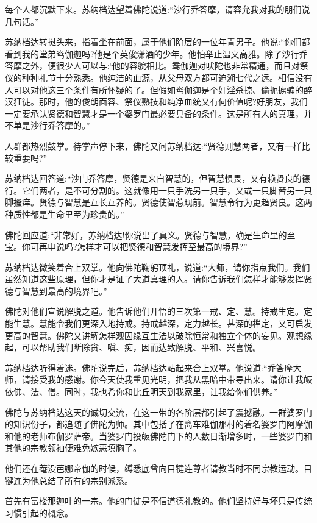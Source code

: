 \documentclass[12pt,twoside,openany]{book}
\begin{document}
每个人都沉默下来。苏纳档达望着佛陀说道:“沙行乔答摩，请容允我对我的朋们说几句话。”

苏纳档达转挝头来，指着坐在前面，属于他们阶层的一位年青男子。他说:“你们都看到我的堂弟鸯伽迦吗?他是个英俊潇酒的少年。他怕举止温文高雅。除了沙行乔答摩之外，便很少人可以与:‘他的容貌相比。鸯伽迦对吠陀也非常精通，而且对祭仪的种种礼节十分熟悉。他纯洁的血源，从父母双方都可迫溯七代之远。相信没有人可以对他这三个条件有所怀疑的了。但假如鸯伽迦是个奸淫杀掠、偷扼掳骗的醉汉狂徒。那时，他的俊朗面容、祭仪熟技和纯净血统又有何价值呢?好朋友，我们一定要承认贤德和智慧才是一个婆罗门最必要具备的条件。这是所有人的真理，并不单是沙行乔答摩的。”

人群都热烈鼓掌。待掌声停下来，佛陀又问苏纳档达:“贤德则慧两者，又有一样比较重要吗?”

苏纳档达回答道:“沙门乔答摩，贤德是来自智慧的，但智慧惧畏，又有赖贤良的德行。它们两者，是不可分割的。这就像用一只手洗另一只手，又或一只脚替另一只脚搔痒。贤德与智慧是互长互养的。贤德使智惹现前。智慧令行为更趋贤良。这两种质性都是生命里至为珍贵的。”

佛陀回应道:“非常好，苏纳档达!你说出了真义。贤德与智慧，确是生命里的至宝。你可再申说吗?怎样才可以把贤德和智慧发挥至最高的境界?”

苏纳档达微笑着合上双掌。他向佛陀鞠躬顶礼，说道:“大师，请你指点我们。我们虽然知道这些原理，但你才是证了大道真理的人。请你告诉我们怎样才能够发挥贤德与智慧到最高的境界吧。”

佛陀对他们宣说解脱之道。他告诉他们开悟的三次第一戒、定、慧。持戒生定。定能生慧。慧能令我们更深入地持戒。持戒越深，定力越长。甚深的禅定，又可启发更高的智慧。佛陀又讲解怎样观因缘互生法以破除恒常和独立个体的妄见。观想缘起，可以帮助我们断除贪、嗔、痴，因而达致解脱、平和、兴喜悦。

苏纳档达听得着迷。佛陀说完后，苏纳档达站起来合上双掌。他说道:“乔答摩大师，请接受我的感谢。你今天使我重见光明，把我从黑暗中带导出来。请你让我皈依佛、法、僧。同时，我也希你和比丘明天到我家里，让我给你们供养。”

佛陀与苏纳档达这天的诚切交流，在这一带的各阶层都引起了震撼融。一群婆罗门的知识份子，都追随了佛陀为师。其中包括了在离车难伽那村的着名婆罗门阿摩伽和他的老师布伽罗萨帝。当婆罗门投皈佛陀门下的人数日渐增多时，一些婆罗门和其他的宗教领袖便难免嫉恶填胸了。

他们还在菴没芭娜帝伽的时候，缚悉底曾向目犍连尊者请教当时不同宗教运动。目犍连为他总结了所有的宗别派系。

首先有富楼那迦叶的一宗。他的门徒是不信道德礼教的。他们坚持好与坏只是传统习惯引起的概念。
\end{document}
